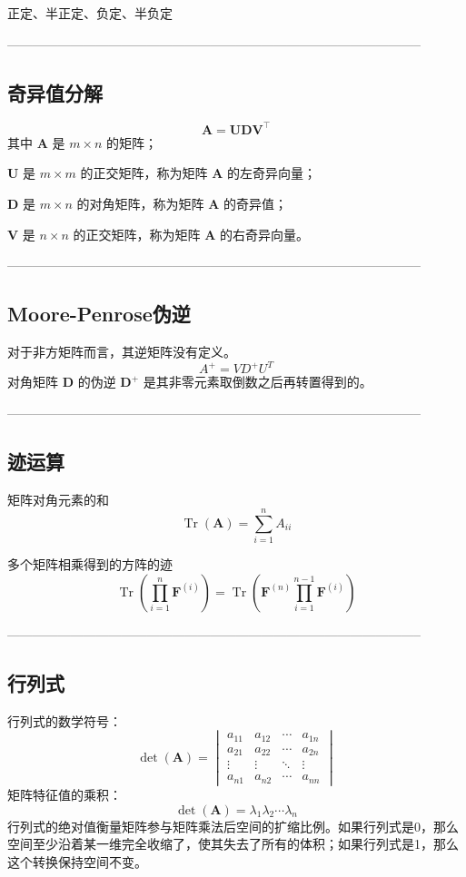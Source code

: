 \documentclass{article}
\begin{document}
正定、半正定、负定、半负定

--------------------------------------------------------------------------------------------------

\subsection{奇异值分解}
$$\mathbf{A} = \mathbf{U} \mathbf{D} \mathbf{V}^\top$$
其中 $\mathbf{A}$ 是 $ m \times n$ 的矩阵；

$\mathbf{U}$ 是 $ m \times m$ 的正交矩阵，称为矩阵 $\mathbf{A}$ 的左奇异向量；

$\mathbf{D}$ 是 $ m \times n$ 的对角矩阵，称为矩阵 $\mathbf{A}$ 的奇异值；

$\mathbf{V}$ 是 $ n \times n$ 的正交矩阵，称为矩阵 $\mathbf{A}$ 的右奇异向量。

--------------------------------------------------------------------------------------------------

\subsection{Moore-Penrose伪逆}
对于非方矩阵而言，其逆矩阵没有定义。
$$A^+ = V D^+ U^T$$
对角矩阵 $\mathbf{D}$ 的伪逆 $\mathbf{D}^+$ 是其非零元素取倒数之后再转置得到的。

--------------------------------------------------------------------------------------------------

\subsection{迹运算}
矩阵对角元素的和
$$\operatorname{Tr}(\mathbf{A}) = \sum_{i=1}^n A_{ii}$$

多个矩阵相乘得到的方阵的迹
$$\operatorname{Tr}\left(\prod_{i=1}^n \mathbf{F}^{(i)}\right)=\operatorname{Tr}\left(\mathbf{F}^{(n)}\prod_{i=1}^{n-1} \mathbf{F}^{(i)}\right)$$

--------------------------------------------------------------------------------------------------

\subsection{行列式}
行列式的数学符号：
$$
\det(\mathbf{A})=\begin{vmatrix}a_{11} & a_{12} & \cdots & a_{1n}\\a_{21} & a_{22} & \cdots & a_{2n}\\\vdots & \vdots & \ddots & \vdots\\a_{n1} & a_{n2} & \cdots & a_{nn}\end{vmatrix}
$$
矩阵特征值的乘积：
$$
\det(\mathbf{A})=\lambda_1 \lambda_2 \cdots \lambda_n
$$
行列式的绝对值衡量矩阵参与矩阵乘法后空间的扩缩比例。如果行列式是0，那么空间至少沿着某一维完全收缩了，使其失去了所有的体积；如果行列式是1，那么这个转换保持空间不变。
\end{document}
